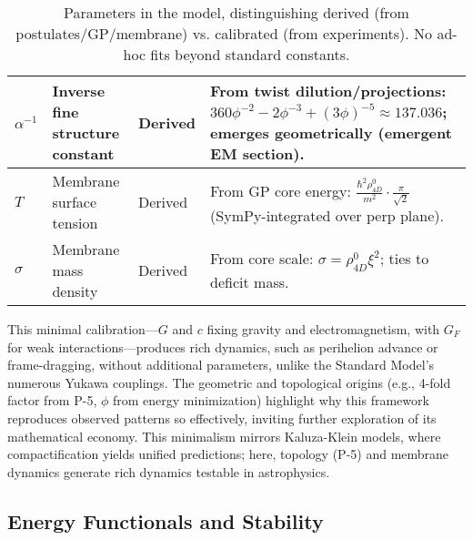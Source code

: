 \begin{table}[H]
\begin{tabularx}{\linewidth}{|p{1.5cm}|p{2cm}|l|Y|}
\hline
$\alpha^{-1}$ & Inverse fine structure constant & Derived & From twist dilution/projections: $360 \phi^{-2} - 2 \phi^{-3} + (3 \phi)^{-5} \approx 137.036$; emerges geometrically (emergent EM section). \\
\hline
$T$ & Membrane surface tension & Derived & From GP core energy: $\frac{\hbar^2 \rho_{4D}^0}{m^2} \cdot \frac{\pi}{\sqrt{2}}$ (SymPy-integrated over perp plane). \\
\hline
$\sigma$ & Membrane mass density & Derived & From core scale: $\sigma = \rho_{4D}^0 \xi^2$; ties to deficit mass. \\
\hline
\end{tabularx}
\caption{Parameters in the model, distinguishing derived (from postulates/GP/membrane) vs. calibrated (from experiments). No ad-hoc fits beyond standard constants.}
\label{tab:parameters}
\end{table}

This minimal calibration---$G$ and $c$ fixing gravity and electromagnetism, with $G_F$ for weak interactions---produces rich dynamics, such as perihelion advance or frame-dragging, without additional parameters, unlike the Standard Model's numerous Yukawa couplings. The geometric and topological origins (e.g., 4-fold factor from P-5, $\phi$ from energy minimization) highlight why this framework reproduces observed patterns so effectively, inviting further exploration of its mathematical economy. This minimalism mirrors Kaluza-Klein models, where compactification yields unified predictions; here, topology (P-5) and membrane dynamics generate rich dynamics testable in astrophysics.

\medskip
\noindent
{}
\medskip

\subsection{Energy Functionals and Stability}


